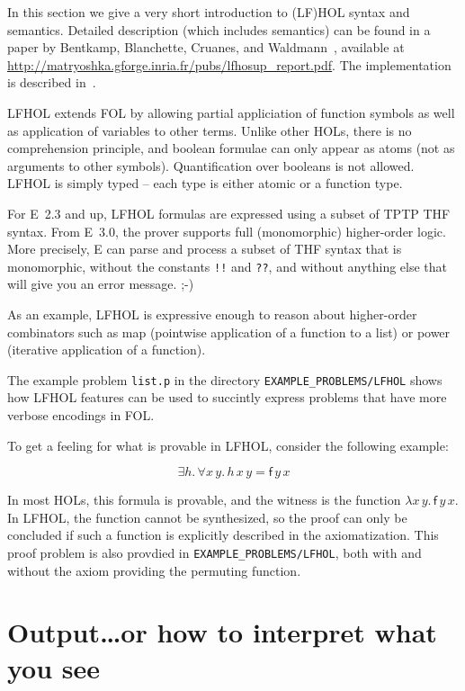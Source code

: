 \documentclass{report}
\begin{document}
In this section we give a very short introduction to (LF)HOL syntax
and semantics. Detailed description (which includes semantics) can be
found in a paper by Bentkamp, Blanchette, Cruanes, and
Waldmann~\cite{BBCW:IJCAR-2018}, available at
\url{http://matryoshka.gforge.inria.fr/pubs/lfhosup_report.pdf}. The
implementation is described
in~\cite{VBCS:TACAS-2019,VBCS:LFHOReport-2018}.

LFHOL extends FOL by allowing partial appliciation of function symbols
as well as application of variables to other terms. Unlike other HOLs,
there is no comprehension principle, and boolean formulae can only
appear as atoms (not as arguments to other symbols). Quantification
over booleans is not allowed. LFHOL is simply typed -- each type is
either atomic or a function type.

For E~2.3 and up, LFHOL formulas are expressed using a subset of TPTP
THF syntax. From E~3.0, the prover supports full (monomorphic)
higher-order logic. More precisely, E can parse and process a subset
of THF syntax that is monomorphic, without the constants \texttt{!!}
and \texttt{??}, and without anything else that will give you an error
message. ;-)

As an example, LFHOL is expressive enough to reason about higher-order
combinators such as \textsf{map} (pointwise application of a function
to a list) or \textsf{power} (iterative application of a function).

The example problem \texttt{list.p} in the directory
\texttt{EXAMPLE\_PROBLEMS/LFHOL} shows how LFHOL features can be used
to succintly express problems that have more verbose encodings in FOL.

To get a feeling for what is provable in LFHOL, consider the following
example:

$$  \exists h.\, \forall x \, y. \, h \, x \, y = \textsf{f}  \, y \, x $$

In most HOLs, this formula is provable, and the witness is the
function $\lambda x \, y. \, \textsf{f} \, y \, x$. In LFHOL, the
function cannot be synthesized, so the proof can only be concluded if
such a function is explicitly described in the axiomatization.  This
proof problem is also provdied in \texttt{EXAMPLE\_PROBLEMS/LFHOL},
both with and without the axiom providing the permuting function.


\chapter{Output\ldots or how to interpret what you see}
\label{sec:output}
\end{document}

